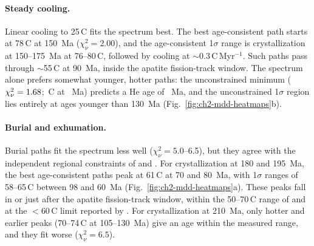 \begin{table}[htbp]
\centering
\caption{Thermal histories fitted to the $^4$He/$^3$He spectrum of HT-Win-06-01b with the
four-domain structure fixed. Each row gives the best path with a predicted He age of
130--180~Ma along with the reduced $\chi^2$ value ($\nu=22$ for steady cooling and the isothermal hold, $\nu=21$ for burial). 
For steady cooling, $T_\mathrm{max}=T_0$ is reached at crystallization, so $t_\mathrm{peak}=t_\mathrm{form}$. For the isothermal hold,
$T_\mathrm{max}=T_\mathrm{iso}$ throughout. Burial crystallization ages are fixed within each row. The last
three columns give the ranges of the age-consistent paths within the joint 1$\sigma$ region
about the best fit (see Eq.~\eqref{eq:gt_mdd_chi2}).}
\label{tab:ch2-mdd-thermal}
\end{table}

\paragraph{Steady cooling.} Linear cooling to 25\,\textdegree C fits the spectrum best. The best
age-consistent path starts at 78\,\textdegree C at 150~Ma ($\chi^2_\nu=2.00$), and the
age-consistent 1$\sigma$ range is crystallization at 150--175~Ma at 76--80\,\textdegree C,
followed by cooling at $\sim$0.3\,\textdegree C\,Myr$^{-1}$. Such paths pass through
$\sim$55\,\textdegree C at 90~Ma, inside the apatite fission-track window. The spectrum alone
prefers somewhat younger, hotter paths: the unconstrained minimum
($\chi^2_\nu=1.68$; \MDDLinGlobalT\,\textdegree C at \MDDLinGlobalTform~Ma) predicts
a He age of \MDDLinGlobalAge~Ma, and the unconstrained 1$\sigma$ region lies entirely at ages
younger than 130~Ma (Fig.~\ref{fig:ch2-mdd-heatmaps}b). 

\paragraph{Burial and exhumation.} Burial paths fit the spectrum less well
($\chi^2_\nu=5.0$--6.5), but they agree with the independent regional constraints of \citet{gibsonstuwe2000} and \citet{mitchell1998}. For
crystallization at 180 and 195~Ma, the best age-consistent paths peak at 61\,\textdegree C at
70 and 80~Ma, with 1$\sigma$ ranges of 58--65\,\textdegree C between 98 and 60~Ma
(Fig.~\ref{fig:ch2-mdd-heatmaps}a). These peaks fall in or just after the apatite
fission-track window, within the 50--70\,\textdegree C range of \citet{gibsonstuwe2000} and at
the $<$60\,\textdegree C limit reported by \citet{mitchell1998}. For crystallization at
210~Ma, only hotter and earlier peaks (70--74\,\textdegree C at 105--130~Ma) give an age within
the measured range, and they fit worse ($\chi^2_\nu=6.5$).

